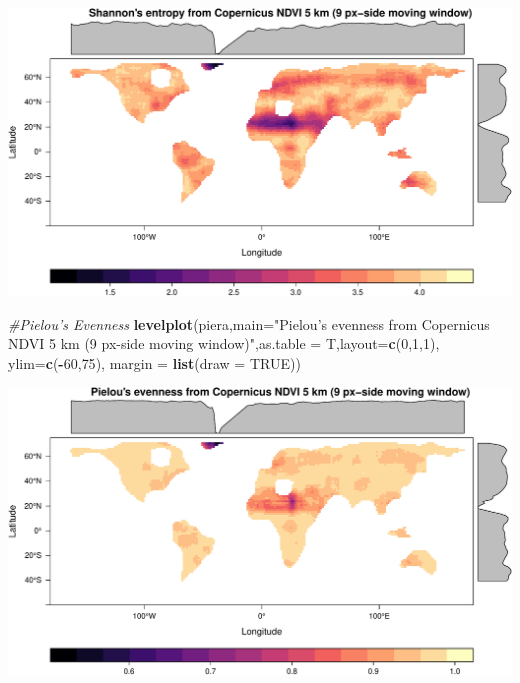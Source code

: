 \documentclass[
]{article}
\newenvironment{Shaded}{\begin{snugshade}}{\end{snugshade}}
\newcommand{\CommentTok}[1]{\textcolor[rgb]{0.56,0.35,0.01}{\textit{#1}}}
\newcommand{\DataTypeTok}[1]{\textcolor[rgb]{0.13,0.29,0.53}{#1}}
\newcommand{\DecValTok}[1]{\textcolor[rgb]{0.00,0.00,0.81}{#1}}
\newcommand{\KeywordTok}[1]{\textcolor[rgb]{0.13,0.29,0.53}{\textbf{#1}}}
\newcommand{\NormalTok}[1]{#1}
\newcommand{\OperatorTok}[1]{\textcolor[rgb]{0.81,0.36,0.00}{\textbf{#1}}}
\newcommand{\OtherTok}[1]{\textcolor[rgb]{0.56,0.35,0.01}{#1}}
\newcommand{\StringTok}[1]{\textcolor[rgb]{0.31,0.60,0.02}{#1}}
\begin{document}
\begin{center}\includegraphics[width=0.95\linewidth]{vignettes_rasterdiv_files/figure-latex/fig02-1} \end{center}

\begin{Shaded}
\begin{Highlighting}[]
\CommentTok{#Pielou's Evenness}
\KeywordTok{levelplot}\NormalTok{(piera,}\DataTypeTok{main=}\StringTok{"Pielou's evenness from Copernicus NDVI 5 km (9 px-side moving window)"}\NormalTok{,}\DataTypeTok{as.table =}\NormalTok{ T,}\DataTypeTok{layout=}\KeywordTok{c}\NormalTok{(}\DecValTok{0}\NormalTok{,}\DecValTok{1}\NormalTok{,}\DecValTok{1}\NormalTok{), }\DataTypeTok{ylim=}\KeywordTok{c}\NormalTok{(}\OperatorTok{-}\DecValTok{60}\NormalTok{,}\DecValTok{75}\NormalTok{), }\DataTypeTok{margin =} \KeywordTok{list}\NormalTok{(}\DataTypeTok{draw =} \OtherTok{TRUE}\NormalTok{))}
\end{Highlighting}
\end{Shaded}

\begin{center}\includegraphics[width=0.95\linewidth]{vignettes_rasterdiv_files/figure-latex/fig03-1} \end{center}
\end{document}
